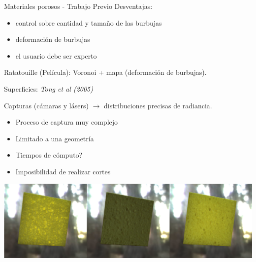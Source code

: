 \documentclass[spanish,unknownkeysallowed]{beamer}
\begin{document}
\begin{frame}{Materiales porosos - Trabajo Previo}
Desventajas: 
\begin{block}{}
\begin{itemize}
\item control sobre cantidad y tamaño de las burbujas
\item deformación de burbujas
\item el usuario debe ser experto
\end{itemize}
\end{block}

Ratatouille (Película): Voronoi + mapa (deformación de burbujas).

\end{frame}

\begin{frame}

Superficies: {\it Tong et al (2005)}

Capturas (cámaras y lásers) $\rightarrow$ distribuciones precisas de radiancia.

\begin{itemize}
\item Proceso de captura muy complejo
\item Limitado a una geometría
\item Tiempos de cómputo?
\item Imposibilidad de realizar cortes
\end{itemize}

\includegraphics[scale = 0.3]{../figures/esponja}

\end{frame}
\end{document}
